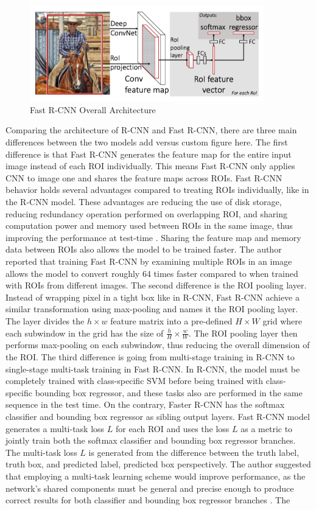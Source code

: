\begin{figure}[!ht]
    \centering
    \includegraphics[width=4in]{figures/fast_rcnn_archiet.png}
    \caption{Fast R-CNN Overall Architecture \cite{fast_rcnn_og}} \label{fig:fast_rcnn_archite}
\end{figure}

Comparing the architecture of R-CNN and Fast R-CNN, there are three main differences between the two models {\color{red} add versus custom figure here}. The first difference is that Fast R-CNN generates the feature map for the entire input image instead of each ROI individually. This means Fast R-CNN only applies CNN to image one and shares the feature maps across ROIs. Fast R-CNN behavior holds several advantages compared to treating ROIs individually, like in the R-CNN model. These advantages are reducing the use of disk storage, reducing redundancy operation performed on overlapping ROI, and sharing computation power and memory used between ROIs in the same image, thus improving the performance at test-time \cite{fast_rcnn_og}. Sharing the feature map and memory data between ROIs also allows the model to be trained faster. The author reported that training Fast R-CNN by examining multiple ROIs in an image allows the model to convert roughly 64 times faster compared to when trained with ROIs from different images. The second difference is the ROI pooling layer. Instead of wrapping pixel in a tight box like in R-CNN, Fast R-CNN achieve a similar transformation using max-pooling and names it the ROI pooling layer. The layer divides the $h \times w$ feature matrix into a pre-defined $H \times W$ grid where each subwindow in the grid has the size of $\frac{h}{H} \times \frac{w}{W}$. The ROI pooling layer then performs max-pooling on each subwindow, thus reducing the overall dimension of the ROI. The third difference is going from multi-stage training in R-CNN to single-stage multi-task training in Fast R-CNN. In R-CNN, the model must be completely trained with class-specific SVM before being trained with class-specific bounding box regressor, and these tasks also are performed in the same sequence in the test time. On the contrary, Faster R-CNN has the softmax classifier and bounding box regressor as sibling output layers. Fast R-CNN model generates a multi-task loss $L$ for each ROI and uses the loss $L$ as a metric to jointly train both the softmax classifier and bounding box regressor branches. The multi-task loss $L$ is generated from the difference between the truth label, truth box, and predicted label, predicted box perspectively. The author suggested that employing a multi-task learning scheme would improve performance, as the network's shared components must be general and precise enough to produce correct results for both classifier and bounding box regressor branches \cite{fast_rcnn_og}. The 